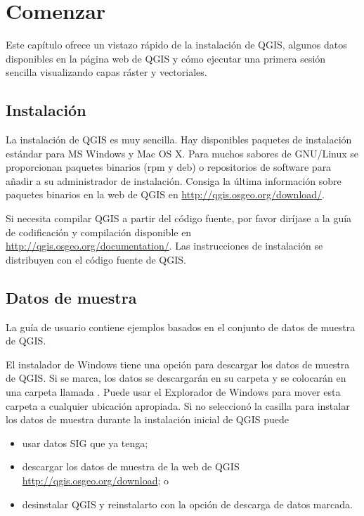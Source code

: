 
\section{Comenzar}\label{label_getstarted}


Este capítulo ofrece un vistazo rápido de la instalación de QGIS, algunos datos disponibles 
en la página web de QGIS y cómo ejecutar una primera sesión sencilla
visualizando capas ráster y vectoriales.

\subsection{Instalación}\label{label_installation}

La instalación de QGIS es muy sencilla. Hay disponibles paquetes de instalación estándar
para MS Windows y Mac OS X. Para muchos sabores de GNU/Linux se proporcionan paquetes
binarios (rpm y deb) o repositorios de software para añadir a su administrador
de instalación. Consiga la última información sobre paquetes binarios en la web de
QGIS en \url{http://qgis.osgeo.org/download/}.


Si necesita compilar QGIS a partir del código fuente, por favor diríjase a la guía de codificación y
compilación disponible en \url{http://qgis.osgeo.org/documentation/}. 
Las instrucciones de instalación se distribuyen con el código fuente de QGIS.

\subsection{Datos de muestra}\label{label_sampledata}

La guía de usuario contiene ejemplos basados en el conjunto de datos
de muestra de QGIS.

\win El instalador de Windows tiene una opción para descargar los datos de muestra de QGIS.
Si se marca, los datos se descargarán en su carpeta 
y se colocarán en una carpeta llamada . 
Puede usar el Explorador de Windows para mover esta carpeta a cualquier ubicación apropiada.
Si no seleccionó la casilla para instalar los datos de muestra
durante la instalación inicial de QGIS puede
\begin{itemize}
\item usar datos SIG que ya tenga;
\item descargar los datos de muestra de la web de QGIS
 \url{http://qgis.osgeo.org/download}; o
\item desinstalar QGIS y reinstalarto con la opción de descarga de datos marcada.
\end{itemize}

